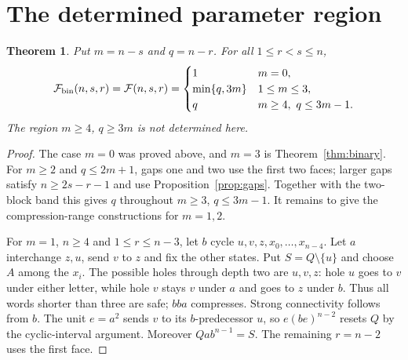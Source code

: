 \documentclass[10pt]{article}
\newtheorem{theorem}{Theorem}
\newcommand{\Max}{\mathcal F}
\begin{document}
\section{The determined parameter region}
\begin{theorem}\label{thm:region}
Put $m=n-s$ and $q=n-r$. For all $1\le r<s\le n$,
\[
 \Max_{\rm bin}(n,s,r)=\Max(n,s,r)=
 \begin{cases}
 1&m=0,\\
 \min\{q,3m\}&1\le m\le3,\\
 q&m\ge4,\ q\le3m-1.
 \end{cases}
\]
The region $m\ge4$, $q\ge3m$ is not determined here.
\end{theorem}
\begin{proof}
The case $m=0$ was proved above, and $m=3$ is Theorem~\ref{thm:binary}.
For $m\ge2$ and $q\le2m+1$, gaps one and two use the first two faces;
larger gaps satisfy $n\ge2s-r-1$ and use Proposition~\ref{prop:gaps}.
Together with the two-block band this gives $q$ throughout $m\ge3$, $q\le3m-1$.
It remains to give the compression-range constructions for $m=1,2$.

For $m=1$, $n\ge4$ and $1\le r\le n-3$, let $b$ cycle
$u,v,z,x_0,\ldots,x_{n-4}$.
Let $a$ interchange $z,u$, send $v$ to $z$ and fix the other states.
Put $S=Q\setminus\{u\}$ and choose $A$ among the $x_i$.
The possible holes through depth two are $u,v,z$:
hole $u$ goes to $v$ under either letter, while hole $v$ stays $v$ under $a$
and goes to $z$ under $b$. Thus all words shorter than three are safe;
$bba$ compresses. Strong connectivity follows from $b$.
The unit $e=a^2$ sends $v$ to its $b$-predecessor $u$, so
$e(be)^{n-2}$ resets $Q$ by the cyclic-interval argument.
Moreover $Qab^{n-1}=S$. The remaining $r=n-2$ uses the first face.


\end{proof}
\end{document}
